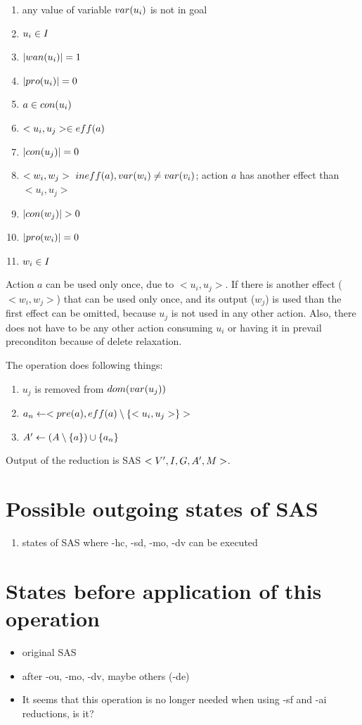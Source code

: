 	\begin{enumerate}
		\item any value of variable $var(u_i)$ is not in goal
		\item $u_i \in I$
		\item $|wan(u_i)| = 1$
		\item $|pro(u_i)| = 0$
		\item $a \in con(u_i)$
		\item $<u_i,u_j> \in eff(a)$
		\item $|con(u_j)| = 0$
		\item $<w_i,w_j> \ in eff(a), var(w_i) \neq var(v_i)$; action $a$ has another effect than $<u_i,u_j>$
		\item $|con(w_j)| > 0$
		\item $|pro(w_i)| = 0$
		\item $w_i \in I$
	\end{enumerate}
	
	Action $a$ can be used only once, due to $<u_i, u_j>$. If there is another effect ($<w_i,w_j>$) that can be used only once, and its output ($w_j$) is used than the first effect can be omitted, because $u_j$ is not used in any other action. Also, there does not have to be any other action consuming $u_i$ or having it in prevail preconditon because of delete relaxation.
	
	
	The operation does following things:
	
	\begin{enumerate}
		\item $u_j$ is removed from $dom(var(u_j))$
		\item $a_n \leftarrow <pre(a), eff(a) \setminus \{<u_i,u_j>\}>$
		\item $A{}' \leftarrow (A \setminus \{a\}) \cup \{a_n\}$
	\end{enumerate}
	
	Output of the reduction is SAS $<V{}', I{}, G{}, A{}', M{}>$.
	
	
	\section{Possible outgoing states of SAS}
	\begin{enumerate}
		\item states of SAS where -hc, -sd, -mo, -dv can be executed
	\end{enumerate}
	
	\section{States before application of this operation}
	\begin{itemize}
		\item original SAS
		\item after -ou, -mo, -dv, maybe others (-de)
		\item It seems that this operation is no longer needed when using -sf and -ai reductions, is it?
	\end{itemize}
	
